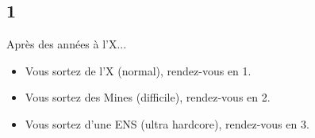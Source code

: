 \documentclass[12pt,a4paper,titlepage]{article}
\begin{document}
\begin{multicols}{2}
\label{n1}
\subsection*{1}
Après des années à l'X... \\
\begin{itemize}
\item Vous sortez de l'X (normal), rendez-vous en 1.
\item Vous sortez des Mines (difficile), rendez-vous en 2.
\item Vous sortez d'une ENS (ultra hardcore), rendez-vous en 3.
\end{itemize}



\end{multicols}
\end{document}
